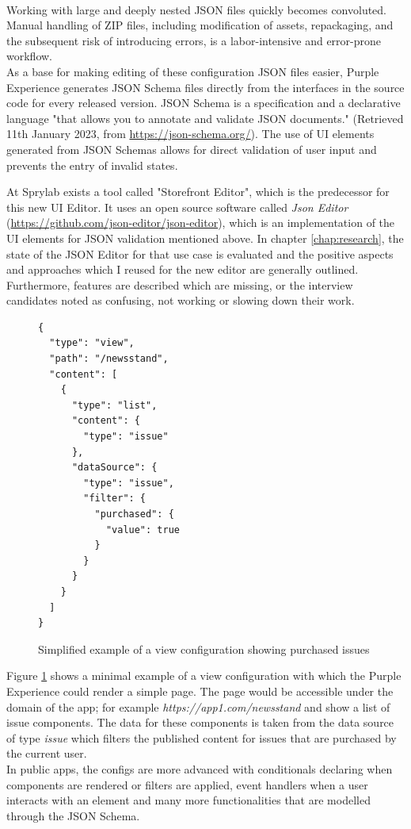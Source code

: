 \\
Working with large and deeply nested JSON files quickly becomes convoluted.
Manual handling of ZIP files, including modification of assets, repackaging, and the subsequent risk of introducing errors, is a labor-intensive and error-prone workflow.
\\
As a base for making editing of these configuration JSON files easier, Purple Experience generates JSON Schema files directly from the interfaces in the source code for every released version.
JSON Schema is a specification and a declarative language "that allows you to annotate and validate JSON documents." (Retrieved 11th January 2023, from \url{https://json-schema.org/}).
The use of UI elements generated from JSON Schemas allows for direct validation of user input and prevents the entry of invalid states.

At Sprylab exists a tool called "Storefront Editor", which is the predecessor for this new UI Editor.
It uses an open source software called \textit{Json Editor} (\url{https://github.com/json-editor/json-editor}), which is an implementation of the UI elements for JSON validation mentioned above.
In chapter \ref{chap:research}, the state of the JSON Editor for that use case is evaluated and the positive aspects and approaches which I reused for the new editor are generally outlined.
Furthermore, features are described which are missing, or the interview candidates noted as confusing, not working or slowing down their work.

\begin{figure}[h]
  \lstset{language=json,basicstyle=\footnotesize\ttfamily,numbers=left,showstringspaces=false,frame=single}
  \begin{lstlisting}
{
  "type": "view",
  "path": "/newsstand",
  "content": [
    {
      "type": "list",
      "content": {
        "type": "issue"
      },
      "dataSource": {
        "type": "issue",
        "filter": {
          "purchased": {
            "value": true
          }
        }
      }
    }
  ]
}
  \end{lstlisting}
  \caption{Simplified example of a view configuration showing purchased issues}
  \label{fig:viewexample}
\end{figure}

Figure \ref{fig:viewexample} shows a minimal example of a view configuration with which the Purple Experience could render a simple page.
The page would be accessible under the domain of the app; for example \textit{https://app1.com/newsstand} and show a list of issue components.
The data for these components is taken from the data source of type \textit{issue} which filters the published content for issues that are purchased by the current user. 
\\
In public apps, the configs are more advanced with conditionals declaring when components are rendered or filters are applied, event handlers when a user interacts with an element and many more functionalities that are modelled through the JSON Schema.


